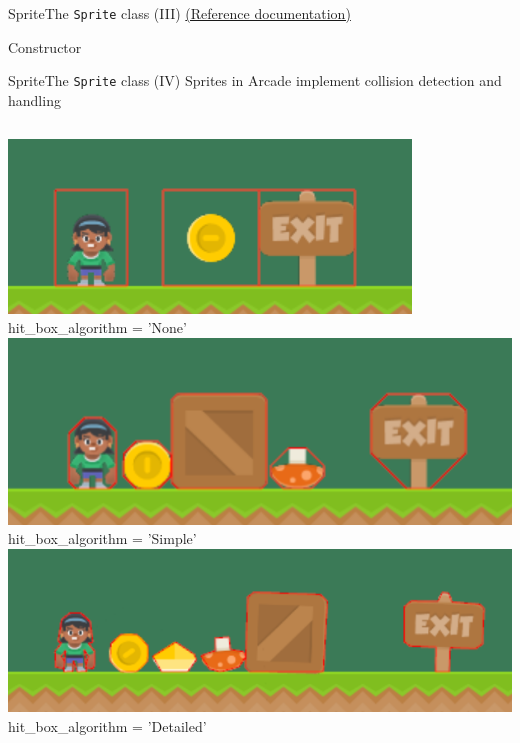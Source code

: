 \documentclass[10pt,compress]{beamer} %
\begin{document}
\begin{frame}{Sprite}{The \texttt{Sprite} class (III)}
	\href{https://api.arcade.academy/en/latest/api/sprites.html}{(Reference documentation)}

	\begin{block}{Constructor}
		\vspace{-0.2cm}
		
		\vspace{-0.2cm}
	\end{block}	

\end{frame}

\begin{frame}{Sprite}{The \texttt{Sprite} class (IV)}
    Sprites in Arcade implement \alert{collision detection} and handling

    \bigskip

    \begin{columns}
		\includegraphics[width=\linewidth]{figs/hitbox-none}\\
		\centering hit\_box\_algorithm = 'None'
		\includegraphics[width=\linewidth]{figs/hitbox-simple}\\
		\centering hit\_box\_algorithm = 'Simple'
		\includegraphics[width=\linewidth]{figs/hitbox-detailed}\\
		\centering hit\_box\_algorithm = 'Detailed'
    \end{columns}
\end{frame}
\end{document}
